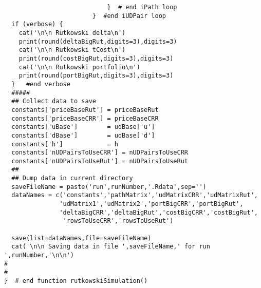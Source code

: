 \documentclass[10pt]{article}
\begin{document}
\begin{verbatim}
                            }  # end iPath loop
                        }  #end iUDPair loop
  if (verbose) {
    cat('\n\n Rutkowski delta\n')
    print(round(deltaBigRut,digits=3),digits=3)
    cat('\n\n Rutkowski tCost\n')
    print(round(costBigRut,digits=3),digits=3)
    cat('\n\n Rutkowski portfolio\n')
    print(round(portBigRut,digits=3),digits=3)
  }   #end verbose
  #####
  ## Collect data to save
  constants['priceBaseRut'] = priceBaseRut
  constants['priceBaseCRR'] = priceBaseCRR
  constants['uBase']        = udBase['u']
  constants['dBase']        = udBase['d']
  constants['h']            = h
  constants['nUDPairsToUseCRR'] = nUDPairsToUseCRR
  constants['nUDPairsToUseRut'] = nUDPairsToUseRut
  ##
  ## Dump data in current directory
  saveFileName = paste('run',runNumber,'.Rdata',sep='')
  dataNames = c('constants','pathMatrix','udMatrixCRR','udMatrixRut',
               'udMatrix1','udMatrix2','portBigCRR','portBigRut',
               'deltaBigCRR','deltaBigRut','costBigCRR','costBigRut',
                'rowsToUseCRR','rowsToUseRut')

  save(list=dataNames,file=saveFileName)
  cat('\n\n Saving data in file ',saveFileName,' for run ',runNumber,'\n\n')
#
#
}  # end function rutkowskiSimulation()
\end{verbatim}
\end{document}
